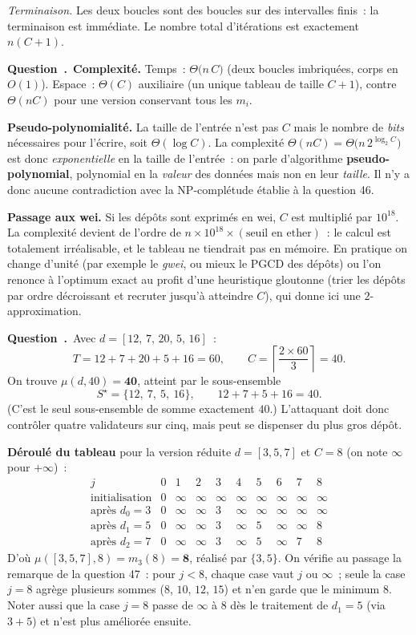 \documentclass[11pt,a4paper]{article}
\renewcommand{\Q}{\medskip\par\stepcounter{qcnt}\noindent\textbf{\color{cnc}Question~\theqcnt.}~}
\begin{document}
\emph{Terminaison.} Les deux boucles sont des boucles  sur des intervalles finis~:
la terminaison est immédiate. Le nombre total d'itérations est exactement $n(C+1)$.

\Q \textbf{Complexité.} Temps~: $\Theta\big(n\,C\big)$ (deux boucles imbriquées, corps en
$O(1)$). Espace~: $\Theta(C)$ auxiliaire (un unique tableau de taille $C+1$), contre
$\Theta(nC)$ pour une version conservant tous les $m_i$.

\textbf{Pseudo-polynomialité.} La taille de l'entrée n'est pas $C$ mais le nombre de
\emph{bits} nécessaires pour l'écrire, soit $\Theta(\log C)$. La complexité $\Theta(nC) =
\Theta\big(n\,2^{\log_2 C}\big)$ est donc \emph{exponentielle} en la taille de l'entrée~: on
parle d'algorithme \textbf{pseudo-polynomial}, polynomial en la \emph{valeur} des données mais
non en leur \emph{taille}. Il n'y a donc aucune contradiction avec la NP-complétude établie à
la question 46.

\textbf{Passage aux wei.} Si les dépôts sont exprimés en wei, $C$ est multiplié par $10^{18}$.
La complexité devient de l'ordre de $n\times 10^{18}\times(\text{seuil en ether})$~: le
calcul est totalement irréalisable, et le tableau ne tiendrait pas en mémoire. En pratique on
change d'unité (par exemple le \emph{gwei}, ou mieux le PGCD des dépôts) ou l'on renonce à
l'optimum exact au profit d'une heuristique gloutonne (trier les dépôts par ordre décroissant
et recruter jusqu'à atteindre $C$), qui donne ici une $2$-approximation.

\Q Avec $d=[12,\,7,\,20,\,5,\,16]$~:
\[ T = 12+7+20+5+16 = 60,\qquad C = \left\lceil \frac{2\times 60}{3}\right\rceil = 40. \]
On trouve $\mu(d,40)=\mathbf{40}$, atteint par le sous-ensemble
\[ S^\star=\{12,\ 7,\ 5,\ 16\},\qquad 12+7+5+16=40. \]
(C'est le seul sous-ensemble de somme exactement $40$.) L'attaquant doit donc contrôler
quatre validateurs sur cinq, mais peut se dispenser du plus gros dépôt.

\textbf{Déroulé du tableau} pour la version réduite $d=[3,5,7]$ et $C=8$ (on note
$\infty$ pour $+\infty$)~:
\[
\begin{array}{l|ccccccccc}
j & 0&1&2&3&4&5&6&7&8\\\hline
\text{initialisation} & 0&\infty&\infty&\infty&\infty&\infty&\infty&\infty&\infty\\
\text{après } d_0=3 & 0&\infty&\infty&3&\infty&\infty&\infty&\infty&\infty\\
\text{après } d_1=5 & 0&\infty&\infty&3&\infty&5&\infty&\infty&8\\
\text{après } d_2=7 & 0&\infty&\infty&3&\infty&5&\infty&7&8
\end{array}
\]
D'où $\mu([3,5,7],8) = m_3(8) = \mathbf{8}$, réalisé par $\{3,5\}$. On vérifie au passage la
remarque de la question 47~: pour $j<8$, chaque case vaut $j$ ou $\infty$~; seule la case
$j=8$ agrège plusieurs sommes ($8$, $10$, $12$, $15$) et n'en garde que le minimum $8$.
Noter aussi que la case $j=8$ passe de $\infty$ à $8$ dès le traitement de $d_1=5$ (via
$3+5$) et n'est plus améliorée ensuite.
\end{document}
